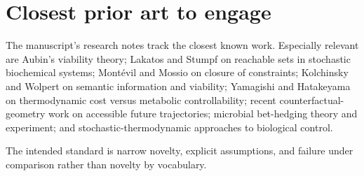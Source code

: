 \documentclass[11pt]{article}
\begin{document}
\section{Closest prior art to engage}

The manuscript's research notes track the closest known work. Especially relevant are Aubin's viability theory; Lakatos and Stumpf on reachable sets in stochastic biochemical systems; Mont\'evil and Mossio on closure of constraints; Kolchinsky and Wolpert on semantic information and viability; Yamagishi and Hatakeyama on thermodynamic cost versus metabolic controllability; recent counterfactual-geometry work on accessible future trajectories; microbial bet-hedging theory and experiment; and stochastic-thermodynamic approaches to biological control.

The intended standard is narrow novelty, explicit assumptions, and failure under comparison rather than novelty by vocabulary.
\end{document}
